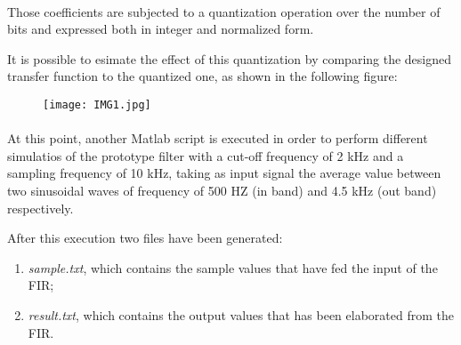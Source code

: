 \paragraph{}
Those coefficients are subjected to a quantization operation over the number of bits and expressed both in integer and normalized form.

It is possible to esimate the effect of this quantization by comparing the designed transfer function to the quantized one, as shown in the following figure: %
\begin{figure}[!ht]
	\texttt{[image: IMG1.jpg]}
	\centering
\end{figure}

\paragraph{}
At this point, another Matlab script is executed in order to perform
different simulatios of the prototype filter with a cut-off frequency of 2 kHz and a sampling frequency of 10 kHz, taking as 
input signal the average value between two sinusoidal waves of frequency of 500 HZ (in band) and 4.5 kHz (out band) respectively.

After this execution two files have been generated:

\begin{enumerate}
	\item \emph{sample.txt}, which contains the sample values that have fed the input of the FIR;
	\item \emph{result.txt}, which contains the output values that has been elaborated from the FIR.
\end{enumerate}

